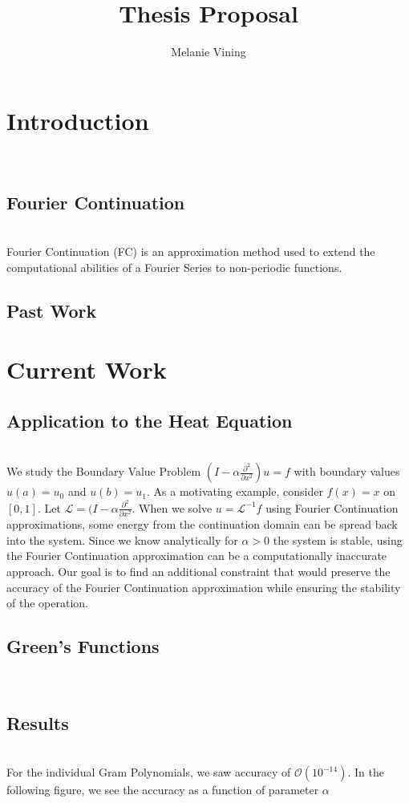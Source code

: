 \documentclass[11pt]{amsart}
\title{Thesis Proposal}
\author{Melanie Vining}
\begin{document}
\maketitle
\section{Introduction} \\
\subsection{Fourier Continuation} \\
Fourier Continuation (FC) is an approximation method used to extend the computational abilities of a Fourier Series to non-periodic functions.  
\subsection{Past Work}
\section{Current Work}
\subsection{Application to the Heat Equation} \\
We study the Boundary Value Problem $(I-\alpha \frac{\partial^2}{\partial x^2})u=f$ with boundary values $u(a)=u_0$ and $u(b)=u_1$.  As a motivating example, consider $f(x)=x$ on $[0,1]$.  Let $\mathcal{L}=(I-\alpha \frac{\partial^2}{\partial x^2}$.  When we solve $u=\mathcal{L}^{-1}f$ using Fourier Continuation approximations, some energy from the continuation domain can be spread back into the system.  Since we know analytically for $\alpha >0$ the system is stable, using the Fourier Continuation approximation can be a computationally inaccurate approach. Our goal is to find an additional constraint that would preserve the accuracy of the Fourier Continuation approximation while ensuring the stability of the operation.  
\subsection{Green's Functions} \\
\subsection{Results} \\
For the individual Gram Polynomials, we saw accuracy of $\mathcal{O}(10^{-14})$.  In the following figure, we see the accuracy as a function of parameter $\alpha$
\end{document}
